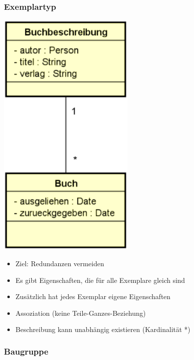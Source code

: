\documentclass[11pt, a4paper]{article}
\begin{document}
\subsubsection*{Exemplartyp}

\begin{minipage}[h]{0.25\textwidth}
    \centering \includegraphics[width=0.5\textwidth]{Analysemuster-01.png} 
\end{minipage}
\begin{minipage}[h]{0.7\textwidth}
    \raggedleft
    \begin{itemize}
        \item Ziel: Redundanzen vermeiden
        \item Es gibt Eigenschaften, die für alle Exemplare gleich sind
        \item Zusätzlich hat jedes Exemplar eigene Eigenschaften
    \end{itemize}
    \vspace{1em}
    \begin{itemize}
        \item Assoziation (keine Teile-Ganzes-Beziehung)
        \item Beschreibung kann unabhängig existieren (Kardinalität *)
    \end{itemize}
\end{minipage}



\subsubsection*{Baugruppe}
\end{document}

